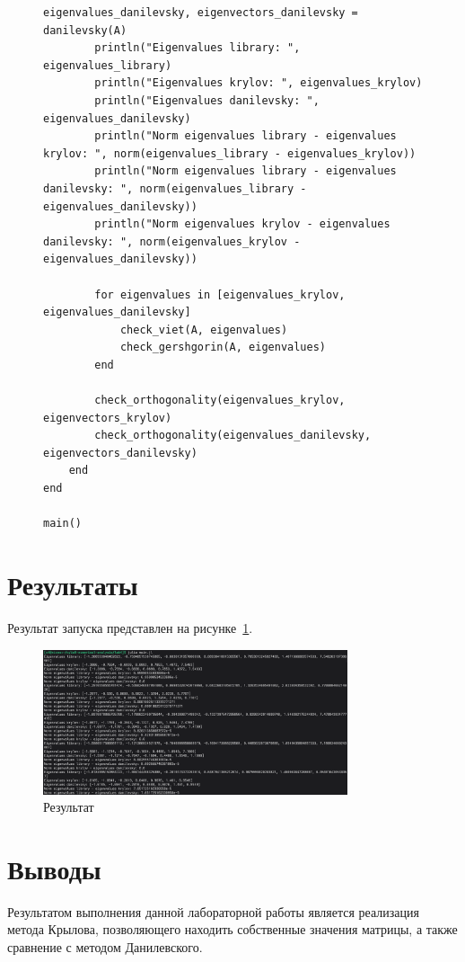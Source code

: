 \documentclass[a4paper, 14pt]{extarticle}
\begin{document}
\begin{figure}[!htb]
\begin{lstlisting}[language={},caption={Метод Крылова (продолжение)},label={lst:code7}]
        eigenvalues_danilevsky, eigenvectors_danilevsky = danilevsky(A)
        println("Eigenvalues library: ", eigenvalues_library)
        println("Eigenvalues krylov: ", eigenvalues_krylov)
        println("Eigenvalues danilevsky: ", eigenvalues_danilevsky)
        println("Norm eigenvalues library - eigenvalues krylov: ", norm(eigenvalues_library - eigenvalues_krylov))
        println("Norm eigenvalues library - eigenvalues danilevsky: ", norm(eigenvalues_library - eigenvalues_danilevsky))
        println("Norm eigenvalues krylov - eigenvalues danilevsky: ", norm(eigenvalues_krylov - eigenvalues_danilevsky))

        for eigenvalues in [eigenvalues_krylov, eigenvalues_danilevsky]
            check_viet(A, eigenvalues)
            check_gershgorin(A, eigenvalues)
        end

        check_orthogonality(eigenvalues_krylov, eigenvectors_krylov)
        check_orthogonality(eigenvalues_danilevsky, eigenvectors_danilevsky)
    end
end

main()
\end{lstlisting}
\end{figure}

\clearpage
\section{Результаты}\label{Sect::res}

Результат запуска представлен на рисунке~\ref{fig:img2}.

\begin{figure}[!htb]
	\centering
	\includegraphics[width=0.8\textwidth]{img2}
\caption{Результат}
\label{fig:img2}
\end{figure}

\clearpage
\section{Выводы}\label{Sect::fin}

Результатом выполнения данной лабораторной работы является реализация метода
Крылова, позволяющего находить собственные значения матрицы, а также сравнение с
методом Данилевского.
\end{document}
